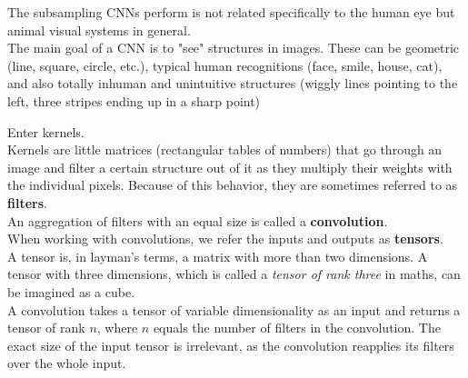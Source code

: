 The subsampling CNNs perform is not related specifically to the human eye but animal visual systems in general.  \cite{MasakazuMatsugu2003}  \\
The main goal of a CNN is to "see" structures in images.  
These can be geometric (line, square, circle, etc.),  
typical human recognitions (face, smile, house, cat),  
and also totally inhuman and unintuitive structures (wiggly lines pointing to the left, three stripes ending up in a sharp point)

Enter kernels.  \\
Kernels are little matrices (rectangular tables of numbers) that go through an image and filter a certain structure out of it as they multiply their weights with the individual pixels. Because of this behavior, they are sometimes referred to as \textbf{filters}. \\

An aggregation of filters with an equal size is called a \textbf{convolution}. \\
When working with convolutions, we refer the inputs and outputs as \textbf{tensors}.\\
A tensor is, in layman's terms, a matrix with more than two dimensions. A tensor with three dimensions, which is called a \emph{tensor of rank three} in maths, can be imagined as a cube.\\
A convolution takes a tensor of variable dimensionality as an input and returns a tensor of rank $n$, where $n$ equals the number of filters in the convolution. The exact size of the input tensor is irrelevant, as the convolution reapplies its filters over the whole input.